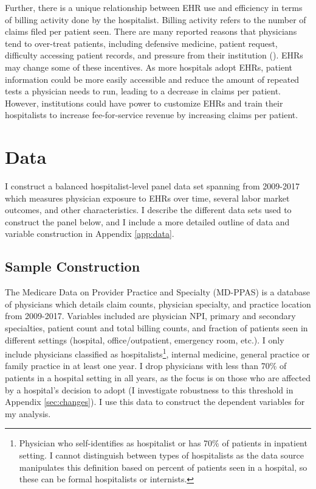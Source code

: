\documentclass[12pt]{article}
\begin{document}
Further, there is a unique relationship between EHR use and efficiency in terms of billing activity done by the hospitalist. Billing activity refers to the number of claims filed per patient seen. There are many reported reasons that physicians tend to over-treat patients, including defensive medicine, patient request, difficulty accessing patient records, and pressure from their institution (\cite{lyu2017overtreatment}). EHRs may change some of these incentives. As more hospitals adopt EHRs, patient information could be more easily accessible and reduce the amount of repeated tests a physician needs to run, leading to a decrease in claims per patient. However, institutions could have power to customize EHRs and train their hospitalists to increase fee-for-service revenue by increasing claims per patient. 





\section{Data}\label{sec:data}

I construct a balanced hospitalist-level panel data set spanning from 2009-2017 which measures physician exposure to EHRs over time, several labor market outcomes, and other characteristics. I describe the different data sets used to construct the panel below, and I include a more detailed outline of data and variable construction in Appendix \ref{app:data}.

\subsection{Sample Construction}

The Medicare Data on Provider Practice and Specialty (MD-PPAS) is a database of physicians which details claim counts, physician specialty, and practice location from 2009-2017. Variables included are physician NPI, primary and secondary specialties, patient count and total billing counts, and fraction of patients seen in different settings (hospital, office/outpatient, emergency room, etc.). I only include physicians classified as hospitalists\footnote{Physician who self-identifies as hospitalist or has 70\% of patients in inpatient setting. I cannot distinguish between types of hospitalists as the data source manipulates this definition based on percent of patients seen in a hospital, so these can be formal hospitalists or internists.}, internal medicine, general practice or family practice in at least one year. I drop physicians with less than 70\% of patients in a hospital setting in all years, as the focus is on those who are affected by a hospital's decision to adopt (I investigate robustness to this threshold in Appendix \ref{sec:changes}). I use this data to construct the dependent variables for my analysis.  
\end{document}
